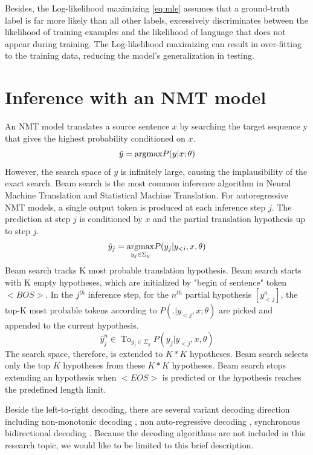 Besides, the Log-likelihood maximizing \ref{eq:mle} assumes that a ground-truth label is far more likely than all other labels, excessively discriminates between the likelihood of training examples and the likelihood of language that does not appear during training. The Log-likelihood maximizing can result in over-fitting to the training data, reducing the model's generalization in testing.



\section{Inference with an NMT model} \label{sec:inference}
An NMT model translates a source sentence $x$ by searching the target sequence y that gives the highest probability conditioned on $x$.
\begin{equation}
\hat{y} = \displaystyle{\mathop{\operatorname*{argmax}}} P(y|x;\theta)
\end{equation}
However, the search space of $y$ is infinitely large, causing the implausibility of the exact search. Beam search \citep{Och98improving} is the most common inference algorithm in Neural Machine Translation and Statistical Machine Translation. For autoregressive NMT models, a single output token is produced at each inference step $j$. The prediction at step $j$ is conditioned by $x$ and the partial translation hypothesis up to step $j$.
\begin{equation}
\hat{y}_j = \displaystyle{\mathop{\operatorname*{argmax}}_{y_j \in \Sigma_y}} P(y_j|y_{<i},x,\theta)
\end{equation}
Beam search tracks K most probable translation hypothesis. Beam search starts with K empty hypotheses, which are initialized by "begin of sentence" token $<BOS>$. In the $j^{th}$ inference step,
for the $n^{th}$ partial hypothesis $[y^{n}_{<j}]$, the top-K most probable tokens according to $P(.| y_{<j},x;\theta)$ are picked and appended to the current hypothesis.
\begin{equation}
\hat{y}^n_j \in \displaystyle{\mathop{Top_{K}}_{y_j \in \Sigma_y}} P(y_j|y_{<j},x,\theta)
\end{equation}
The search space, therefore, is extended to $K*K$ hypotheses. Beam search selects only the top $K$ hypotheses from these $K*K$ hypotheses. Beam search stops extending an hypothesis when $<EOS>$ is predicted or  the hypothesis reaches the predefined length limit. 

Beside the left-to-right decoding, there are several variant decoding direction including non-monotonic decoding \citep{Welleck19non}, non auto-regressive decoding \citep{Jiatao17non}, synchronous bidirectional decoding \cite{Zhou19synchronous}. Because the decoding algorithms are not included in this research topic, we would like to be limited to this brief description.
